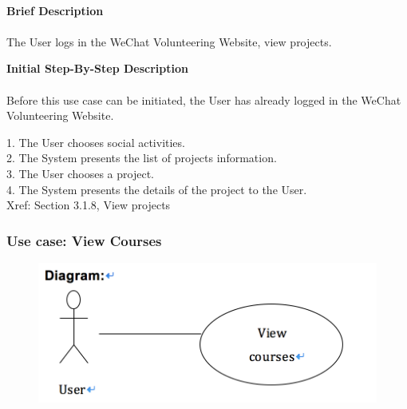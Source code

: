 \documentclass[12pt]{report}
\begin{document}
\paragraph{}
\begin{flushleft}
\textbf{Brief Description }
\paragraph{}
The User logs in the WeChat Volunteering Website, view projects.\\

\begin{flushleft}
\textbf{Initial Step-By-Step Description }
\paragraph{}
Before this use case can be initiated, the User has already logged in the WeChat Volunteering Website.
\begin{flushleft}
1.	The User chooses social activities. \\
2.	The System presents the list of projects information. \\
3.	The User chooses a project.  \\
4.	The System presents the details of the project to the User. \\
Xref: Section 3.1.8, View projects

\end{flushleft}
\end{flushleft}
\end{flushleft}


\newpage
\subsubsection{Use case: View Courses }

\begin{figure}[!htb]
  \includegraphics{9.PNG}
\end{figure}
\end{document}
